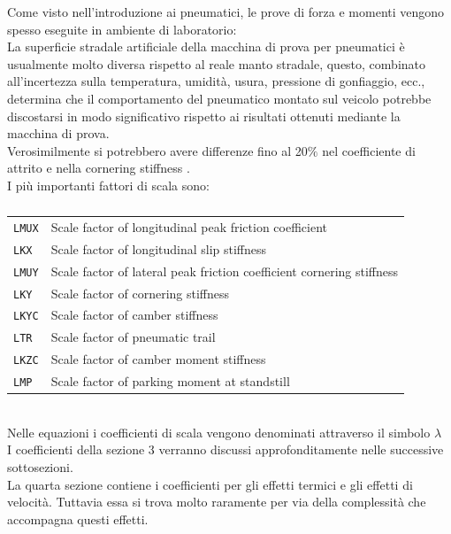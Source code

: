 Come visto nell'introduzione ai pneumatici, le prove di forza e momenti vengono spesso eseguite in ambiente di laboratorio:\\ 
La superficie stradale artificiale della macchina di prova per pneumatici è usualmente molto diversa rispetto al reale manto stradale, questo, combinato all'incertezza sulla temperatura, umidità, usura, pressione di gonfiaggio, ecc., determina che il comportamento del pneumatico montato sul veicolo potrebbe discostarsi in modo significativo rispetto ai risultati ottenuti mediante la macchina di prova.\\
Verosimilmente si potrebbero avere differenze fino al 20$\%$ nel coefficiente di attrito e nella cornering stiffness \cite{Braghin2006EnvironmentalEO}.\\
I più importanti fattori di scala sono:\\
\begin{table}[h!] 
    {\scriptsize\setlength\itemsep{-0.2em}
    \centering
    \begin{tabular}{l l}
        \texttt{LMUX} \qquad \quad  & Scale factor of longitudinal peak friction coefficient\\
        \texttt{LKX} & Scale factor of longitudinal slip stiffness\\
        \texttt{LMUY} & Scale factor of lateral peak friction coefficient cornering stiffness\\
        \texttt{LKY} & Scale factor of cornering stiffness\\
        \texttt{LKYC} & Scale factor of camber stiffness\\
        \texttt{LTR} & Scale factor of pneumatic trail\\
        \texttt{LKZC} & Scale factor of camber moment stiffness\\
        \texttt{LMP} & Scale factor of parking moment at standstill\\
    \end{tabular}

    }
    \caption{}
    \label{tab:scaling factors}
\end{table}
\\
Nelle equazioni i coefficienti di scala vengono denominati attraverso il simbolo $\lambda$\\
I coefficienti della sezione 3 verranno discussi 
approfonditamente nelle successive sottosezioni.\\
La quarta sezione contiene i coefficienti per gli effetti termici e gli effetti di velocità.
Tuttavia essa si trova molto raramente per via della complessità che accompagna questi effetti.

